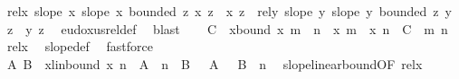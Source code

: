 \begin{isabellebody}
\ rel{\isacharunderscore}{\kern0pt}x{\isacharcolon}{\kern0pt}\ {\isachardoublequoteopen}slope\ x{\isachardoublequoteclose}\ {\isachardoublequoteopen}slope\ x{\isacharprime}{\kern0pt}{\isachardoublequoteclose}\ {\isachardoublequoteopen}bounded\ {\isacharparenleft}{\kern0pt}{\isasymlambda}z{\isachardot}{\kern0pt}\ x\ z\ {\isacharminus}{\kern0pt}\ x{\isacharprime}{\kern0pt}\ z{\isacharparenright}{\kern0pt}{\isachardoublequoteclose}\ \ rel{\isacharunderscore}{\kern0pt}y{\isacharcolon}{\kern0pt}\ {\isachardoublequoteopen}slope\ y{\isachardoublequoteclose}\ {\isachardoublequoteopen}slope\ y{\isacharprime}{\kern0pt}{\isachardoublequoteclose}\ {\isachardoublequoteopen}bounded\ {\isacharparenleft}{\kern0pt}{\isasymlambda}z{\isachardot}{\kern0pt}\ y\ z\ {\isacharminus}{\kern0pt}\ y{\isacharprime}{\kern0pt}\ z{\isacharparenright}{\kern0pt}{\isachardoublequoteclose}\ \isamarkupfalse%
\ eudoxus{\isacharunderscore}{\kern0pt}rel{\isacharunderscore}{\kern0pt}def\ \isamarkupfalse%
\ blast{\isacharplus}{\kern0pt}\isanewline
\isanewline
\ \ \isamarkupfalse%
\ C\ \ x{\isacharprime}{\kern0pt}{\isacharunderscore}{\kern0pt}bound{\isacharcolon}{\kern0pt}\ {\isachardoublequoteopen}{\isasymbar}x{\isacharprime}{\kern0pt}\ {\isacharparenleft}{\kern0pt}m\ {\isacharplus}{\kern0pt}\ n{\isacharparenright}{\kern0pt}\ {\isacharminus}{\kern0pt}\ {\isacharparenleft}{\kern0pt}x{\isacharprime}{\kern0pt}\ m\ {\isacharplus}{\kern0pt}\ x{\isacharprime}{\kern0pt}\ n{\isacharparenright}{\kern0pt}{\isasymbar}\ {\isasymle}\ C{\isachardoublequoteclose}\ \ m\ n\ \isamarkupfalse%
\ rel{\isacharunderscore}{\kern0pt}x{\isacharparenleft}{\kern0pt}{}{\isacharparenright}{\kern0pt}\ \isamarkupfalse%
\ slope{\isacharunderscore}{\kern0pt}def\ \isamarkupfalse%
\ fastforce\isanewline
\ \ \isanewline
\ \ \isamarkupfalse%
\ A\ B\ \ x{\isacharprime}{\kern0pt}{\isacharunderscore}{\kern0pt}lin{\isacharunderscore}{\kern0pt}bound{\isacharcolon}{\kern0pt}\ {\isachardoublequoteopen}{\isasymbar}x{\isacharprime}{\kern0pt}\ n{\isasymbar}\ {\isasymle}\ A\ {\isacharasterisk}{\kern0pt}\ {\isasymbar}n{\isasymbar}\ {\isacharplus}{\kern0pt}\ B{\isachardoublequoteclose}\ {\isachardoublequoteopen}{}\ {\isasymle}\ A{\isachardoublequoteclose}\ {\isachardoublequoteopen}{}\ {\isasymle}\ B{\isachardoublequoteclose}\ \ n\ \isamarkupfalse%
\ slope{\isacharunderscore}{\kern0pt}linear{\isacharunderscore}{\kern0pt}bound{\isacharbrackleft}{\kern0pt}OF\ rel{\isacharunderscore}{\kern0pt}x{\isacharparenleft}{\kern0pt}{}{\isacharparenright}{\kern0pt}{\isacharbrackright}{\kern0pt}\ \isamarkupfalse%

\end{isabellebody}
